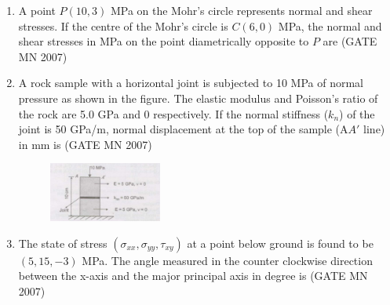 \documentclass[journal]{IEEEtran}
\begin{document}
\begin{enumerate}
\item A point $P(10,3)$ MPa on the Mohr’s circle represents normal and shear stresses. If the centre of the Mohr’s circle is $C(6,0)$ MPa, the normal and shear stresses in MPa on the point diametrically opposite to $P$ are
	\hfill (GATE MN 2007)
\begin{enumerate}
	\begin{multicols}{4}
    \item 2, $-3$
    \item 4, $-3$
    \item 2, 3
    \item 4, 3
	    \end{multicols}
\end{enumerate}


\item A rock sample with a horizontal joint is subjected to 10 MPa of normal pressure as shown in the figure. The elastic modulus and Poisson’s ratio of the rock are 5.0 GPa and 0 respectively. If the normal stiffness ($k_n$) of the joint is 50 GPa/m, normal displacement at the top of the sample (A$A'$ line) in mm is
	\hfill (GATE MN 2007)
\begin{figure}[H]
    \centering
\includegraphics[width=0.35\textwidth]{Screenshot_2025_0812_124013.png}
\caption*{}
    \label{fig:Q27}
\end{figure}
\begin{enumerate}
	\begin{multicols}{4}
    \item 0.2
    \item 0.4
    \item 0.6
    \item 0.8
	    \end{multicols}
\end{enumerate}



\item The state of stress $(\sigma_{xx}, \sigma_{yy}, \tau_{xy})$ at a point below ground is found to be $(5, 15, -3)$ MPa. The angle measured in the counter clockwise direction between the x-axis and the major principal axis in degree is
	\hfill (GATE MN 2007)
\begin{enumerate}
\end{enumerate}



\end{enumerate}
\end{document}
